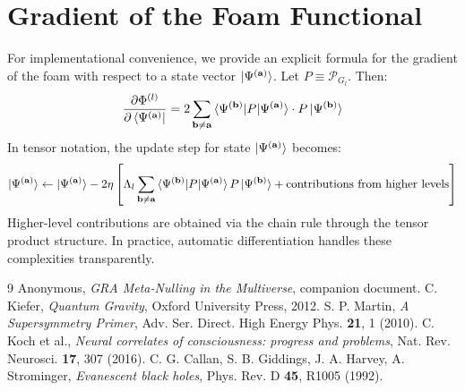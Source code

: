 \documentclass[11pt,a4paper]{article}
\begin{document}
\appendix
\section{Gradient of the Foam Functional}
For implementational convenience, we provide an explicit formula for the gradient of the foam with respect to a state vector \(\ket{\Psi^{(\mathbf{a})}}\). Let \(P \equiv \mathcal{P}_{G_l}\). Then:
\begin{equation}
\frac{\partial \Phi^{(l)}}{\partial \bra{\Psi^{(\mathbf{a})}}} = 2 \sum_{\mathbf{b} \neq \mathbf{a}} \braket{\Psi^{(\mathbf{b})} | P | \Psi^{(\mathbf{a})}} \cdot P \ket{\Psi^{(\mathbf{b})}}
\end{equation}
In tensor notation, the update step for state \(\ket{\Psi^{(\mathbf{a})}}\) becomes:
\begin{equation}
\ket{\Psi^{(\mathbf{a})}} \leftarrow \ket{\Psi^{(\mathbf{a})}} - 2\eta \left[ \Lambda_l \sum_{\mathbf{b} \neq \mathbf{a}} \braket{\Psi^{(\mathbf{b})} | P | \Psi^{(\mathbf{a})}} P \ket{\Psi^{(\mathbf{b})}} + \text{contributions from higher levels} \right]
\end{equation}
Higher-level contributions are obtained via the chain rule through the tensor product structure. In practice, automatic differentiation handles these complexities transparently.

\begin{thebibliography}{9}
 Anonymous, \textit{GRA Meta-Nulling in the Multiverse}, companion document.
 C. Kiefer, \textit{Quantum Gravity}, Oxford University Press, 2012.
 S. P. Martin, \textit{A Supersymmetry Primer}, Adv. Ser. Direct. High Energy Phys. \textbf{21}, 1 (2010).
 C. Koch et al., \textit{Neural correlates of consciousness: progress and problems}, Nat. Rev. Neurosci. \textbf{17}, 307 (2016).
 C. G. Callan, S. B. Giddings, J. A. Harvey, A. Strominger, \textit{Evanescent black holes}, Phys. Rev. D \textbf{45}, R1005 (1992).
\end{thebibliography}
\end{document}
